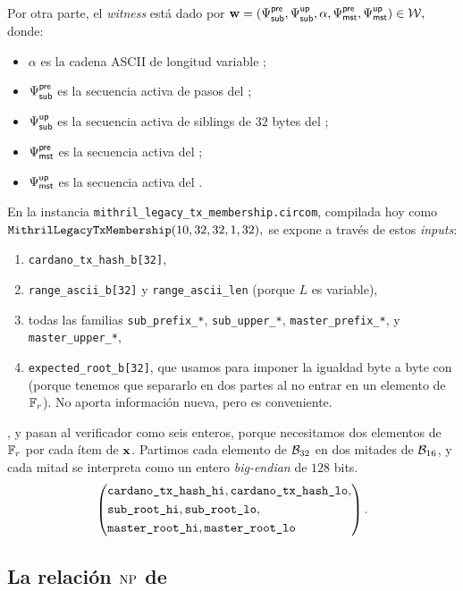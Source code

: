 Por otra parte, el \textit{witness} está dado por $\mathbf{w} = (\Psi_{\mathsf{sub}}^{\mathsf{pre}}, \Psi_{\mathsf{sub}}^{\mathsf{up}}, \alpha, \Psi_{\mathsf{mst}}^{\mathsf{pre}}, \Psi_{\mathsf{mst}}^{\mathsf{up}}) \in \mathcal{W},$ donde:
\begin{itemize}[noitemsep]
  \item $\alpha$ es la cadena ASCII de longitud variable \RangeAscii;
  \item $\Psi_{\mathsf{sub}}^{\mathsf{pre}}$ es la secuencia activa de pasos del \SubPrefix;
  \item $\Psi_{\mathsf{sub}}^{\mathsf{up}}$ es la secuencia activa de siblings de $32$ bytes del \SubUpper;
  \item $\Psi_{\mathsf{mst}}^{\mathsf{pre}}$ es la secuencia activa del \MasterPrefix;
  \item $\Psi_{\mathsf{mst}}^{\mathsf{up}}$ es la secuencia activa del \MasterUpper.
\end{itemize}
En la instancia \texttt{mithril\_legacy\_tx\_membership\allowbreak.circom}, compilada hoy como
$\texttt{MithrilLegacyTxMembership}(10,32,32,1,32),$ se expone a través de estos \textit{inputs}:
\begin{enumerate}[noitemsep]
  \item \texttt{cardano\_tx\_hash\_b[32]},
  \item \texttt{range\_ascii\_b[32]} y \texttt{range\_ascii\_len} (porque $L$ es variable),
  \item todas las familias \texttt{sub\_prefix\_*}, \texttt{sub\_upper\_*}, \texttt{master\_prefix\_*}, y \texttt{master\_upper\_*},
  \item \texttt{expected\_root\_b[32]}, que usamos para imponer la igualdad byte a byte con \TxSetRoot (porque tenemos que separarlo en dos partes al no entrar en un elemento de $\mathbb{F}_r$). No aporta información nueva, pero es conveniente.
\end{enumerate}

\TxId, \SnapshotSubRoot y \TxSetRoot pasan al verificador \Groth \Onchain como seis enteros, porque necesitamos dos elementos de $\mathbb{F}_r$ por cada ítem de $\mathbf{x}$. Partimos cada elemento de $\mathcal{B}_{32}$ en dos mitades de $\mathcal{B}_{16}$, y cada mitad se interpreta como un entero \textit{big-endian} de $128$ bits.
$$\left(\begin{aligned}
  &\texttt{cardano\_tx\_hash\_hi}, \texttt{cardano\_tx\_hash\_lo},\\
  &\texttt{sub\_root\_hi}, \texttt{sub\_root\_lo},\\
  &\texttt{master\_root\_hi}, \texttt{master\_root\_lo}
\end{aligned}\right).$$

\subsection{La relación \texorpdfstring{\(\mathrm{NP}\)}{NP} de \TxSnapshotMembershipCircuit}
\label{subsec:tx-snapshot-membership-la-relacion-np-de-txsnapshotmembershipcircuit}

